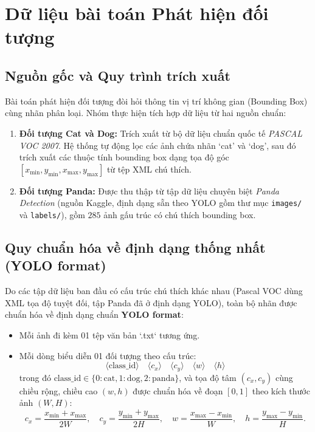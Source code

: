 \documentclass[fontsize=13pt,a4paper,oneside,DIV=calc,chapterprefix=true]{scrbook}
\begin{document}
\section{Dữ liệu bài toán Phát hiện đối tượng}
\subsection{Nguồn gốc và Quy trình trích xuất}
Bài toán phát hiện đối tượng đòi hỏi thông tin vị trí không gian (Bounding Box) cùng nhãn phân loại. Nhóm thực hiện tích hợp dữ liệu từ hai nguồn chuẩn:
\begin{enumerate}[leftmargin=1.2cm]
    \item \textbf{Đối tượng Cat và Dog:} Trích xuất từ bộ dữ liệu chuẩn quốc tế \textit{PASCAL VOC 2007}. Hệ thống tự động lọc các ảnh chứa nhãn `cat' và `dog', sau đó trích xuất các thuộc tính bounding box dạng tọa độ góc $[x_{\min}, y_{\min}, x_{\max}, y_{\max}]$ từ tệp XML chú thích.
    \item \textbf{Đối tượng Panda:} Được thu thập từ tập dữ liệu chuyên biệt \textit{Panda Detection} (nguồn Kaggle, định dạng sẵn theo YOLO gồm thư mục \texttt{images/} và \texttt{labels/}), gồm $285$ ảnh gấu trúc có chú thích bounding box.
\end{enumerate}

\subsection{Quy chuẩn hóa về định dạng thống nhất (YOLO format)}
Do các tập dữ liệu ban đầu có cấu trúc chú thích khác nhau (Pascal VOC dùng XML tọa độ tuyệt đối, tập Panda đã ở định dạng YOLO), toàn bộ nhãn được chuẩn hóa về định dạng chuẩn \textbf{YOLO format}:
\begin{itemize}[leftmargin=1.2cm]
    \item Mỗi ảnh đi kèm 01 tệp văn bản `.txt` tương ứng.
    \item Mỗi dòng biểu diễn 01 đối tượng theo cấu trúc:
    \begin{equation}
    \langle\mathrm{class\_id}\rangle \quad \langle c_x \rangle \quad \langle c_y \rangle \quad \langle w \rangle \quad \langle h \rangle
    \end{equation}
    trong đó $\mathrm{class\_id} \in \{0: \text{cat}, 1: \text{dog}, 2: \text{panda}\}$, và tọa độ tâm $(c_x, c_y)$ cùng chiều rộng, chiều cao $(w, h)$ được chuẩn hóa về đoạn $[0, 1]$ theo kích thước ảnh $(W, H)$:
    \begin{equation}
    c_x = \frac{x_{\min} + x_{\max}}{2W}, \quad c_y = \frac{y_{\min} + y_{\max}}{2H}, \quad w = \frac{x_{\max} - x_{\min}}{W}, \quad h = \frac{y_{\max} - y_{\min}}{H}.
    \end{equation}
\end{itemize}
\end{document}
